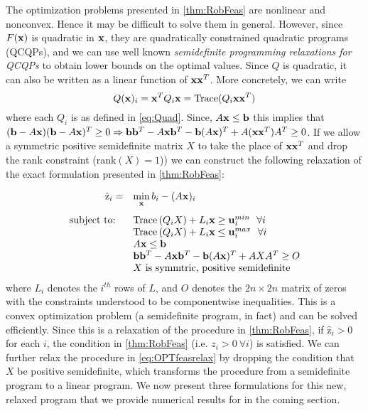 The optimization problems presented in \cref{thm:RobFeas} are nonlinear and nonconvex.
Hence it may be difficult to solve them in general.
However, since $F(\mathbf{x})$ is quadratic in $\mathbf{x}$, they are quadratically constrained quadratic programs (QCQPs), and we can use well known \emph{semidefinite programming relaxations for QCQPs} 
to obtain lower bounds on the optimal values.\cite{VaBo1996} 
Since $Q$ is quadratic, it can also be written as a linear function of $\mathbf{x}\mathbf{x}^T$.
More concretely, we can write
$$Q(\mathbf{x})_i=\mathbf{x}^TQ_i\mathbf{x}=\operatorname{Trace}(Q_i\mathbf{x}\mathbf{x}^T)$$
where each $Q_i$ is as defined in \cref{eq:Quad}. 
Since, $A\mathbf{x}\leq \mathbf{b}$ this implies that $(\mathbf{b}-A\mathbf{x})(\mathbf{b}-A\mathbf{x})^T\geq 0\Rightarrow \mathbf{b}\mathbf{b}^T-A\mathbf{x}\mathbf{b}^T-\mathbf{b}(A\mathbf{x})^T+A(\mathbf{x}\mathbf{x}^T)A^T\geq 0$. 
If we allow a symmetric positive semidefinite matrix $X$ to take the place of $\mathbf{x}\mathbf{x}^T$ and drop the rank constraint (rank$(X)=1$)) we can construct the following relaxation of the exact formulation presented in \cref{thm:RobFeas}:
 
\begin{equation}\label{eq:OPTfeasrelax}
  \begin{array}{rl}
    \hat{\mathrm{z}}_{i} = & \min\limits_{\vx}  b_i-(A\vx)_i  \\
    \vspace*{-0.05in} \\
    \text{subject to: } \ & \Tr\left(Q_iX\right)+ L_i\vx \geq \vu_i^{min} \ \ \forall i\\
    & \Tr\left(Q_iX\right)+ L_i\vx \leq \vu_i^{max} \ \ \forall i\\
    &A\vx\leq \vb \\
    &\vb\vb^T-A\vx\vb^T-\vb(A\vx)^T+AXA^T\geq O \\
    &X \text{ is symmtric, positive semidefinite}
  \end{array}
\end{equation}
%
where $L_i$ denotes the $i^{th}$ rows of $L$, and $O$ denotes the $2n \times 2n$ matrix of zeros with the constraints understood to be componentwise inequalities. 
This is a convex optimization problem (a semidefinite program, in fact) and can be solved efficiently. 
Since this is a relaxation of the procedure in \cref{thm:RobFeas}, if $\hat{\mathrm{z}}_i>0$ for each $i$, the condition in \cref{thm:RobFeas} (i.e. $z_i>0 \ \forall i$) is satisfied. 
We can further relax the procedure in \cref{eq:OPTfeasrelax} by dropping the condition that $X$ be positive semidefinite, which transforms the procedure from a semidefinite program to a linear program. 
We now present three formulations for this new, relaxed program that we provide numerical results for in the coming section.\\

